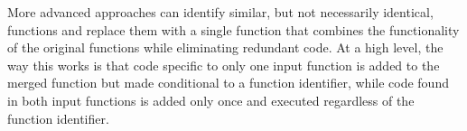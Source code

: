 More advanced approaches can identify similar, but not necessarily identical, functions and replace them with a single function that combines the functionality of the original functions while eliminating redundant code.
At a high level, the way this works is that code specific to only one input function is added to the merged function but made conditional to a function identifier, while code found in both input functions is added only once and executed regardless of the function identifier.




